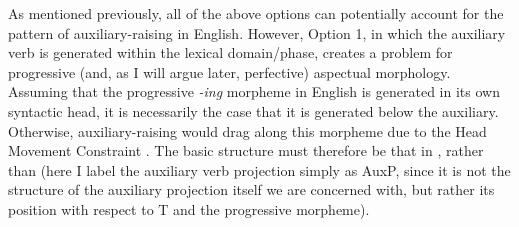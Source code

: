 As mentioned previously, all of the above options can potentially account for the pattern of auxiliary-raising in English. However, Option 1, in which the auxiliary verb is generated within the lexical domain/phase, creates a problem for progressive (and, as I will argue later, perfective) aspectual morphology. Assuming that the progressive {\it -ing} morpheme in English is generated in its own syntactic head, it is necessarily the case that it is generated below the auxiliary. Otherwise, auxiliary-raising would drag along this morpheme due to the Head Movement Constraint \citep{travis1984}. The basic structure must therefore be that in \Next[a], rather than \Next[b] (here I label the auxiliary verb projection simply as AuxP, since it is not the structure of the auxiliary projection itself we are concerned with, but rather its position with respect to T and the progressive morpheme).

